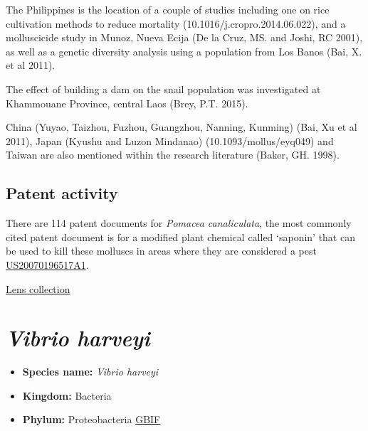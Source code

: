\documentclass[]{book}
\providecommand{\tightlist}{%
  \setlength{\itemsep}{0pt}\setlength{\parskip}{0pt}}
\theoremstyle{definition}
\theoremstyle{definition}
\theoremstyle{definition}
\theoremstyle{remark}
\begin{document}
The Philippines is the location of a couple of studies including one on
rice cultivation methods to reduce mortality
(10.1016/j.cropro.2014.06.022), and a molluscicide study in Munoz, Nueva
Ecija (De la Cruz, MS. and Joshi, RC 2001), as well as a genetic
diversity analysis using a population from Los Banos (Bai, X. et al
2011).

The effect of building a dam on the snail population was investigated at
Khammouane Province, central Laos (Brey, P.T. 2015).

China (Yuyao, Taizhou, Fuzhou, Guangzhou, Nanning, Kunming) (Bai, Xu et
al 2011), Japan (Kyushu and Luzon Mindanao) (10.1093/mollus/eyq049) and
Taiwan are also mentioned within the research literature (Baker, GH.
1998).

\hypertarget{patent-activity-7}{%
\subsection{Patent activity}\label{patent-activity-7}}

There are 114 patent documents for \emph{Pomacea canaliculata}, the most
commonly cited patent document is for a modified plant chemical called
`saponin' that can be used to kill these molluscs in areas where they
are considered a pest
\href{https://www.lens.org/lens/patent/US_2007_0196517_A1}{US20070196517A1}.

\href{https://www.lens.org/lens/collection/24984}{Lens collection}

\hypertarget{vibrio-harveyi}{%
\section{\texorpdfstring{\emph{Vibrio
harveyi}}{Vibrio harveyi}}\label{vibrio-harveyi}}

\begin{itemize}
\tightlist
\item
  \textbf{Species name:} \emph{Vibrio harveyi}
\item
  \textbf{Kingdom:} Bacteria\\
\item
  \textbf{Phylum:} Proteobacteria
  \href{https://www.gbif.org/species/5427692}{GBIF}
\end{itemize}
\end{document}
